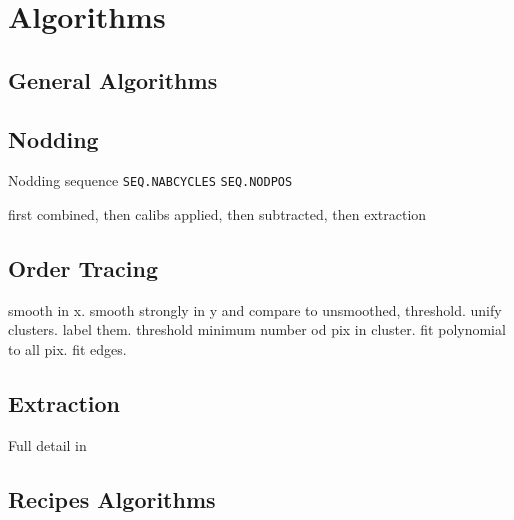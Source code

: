 \section{Algorithms}
\label{sec:algorithms}


\subsection{General Algorithms}
\label{sec:algorithms-general}

\subsection{Nodding}
\label{sec:nodd}

Nodding sequence \texttt{SEQ.NABCYCLES}
\texttt{SEQ.NODPOS}

first combined, then calibs applied, then subtracted, then extraction

\subsection{Order Tracing}
\label{sec:ordertrace}

smooth in x.
smooth strongly in y and compare to unsmoothed, threshold.
unify clusters.
label them.
threshold minimum number od pix in cluster.
fit polynomial to all pix.
fit edges.

\subsection{Extraction}
\label{sec:extract}

Full detail in
\cite{2021A&A...646A..32P}

\subsection{Recipes Algorithms} 
\label{sec:algorithms-recipes}
